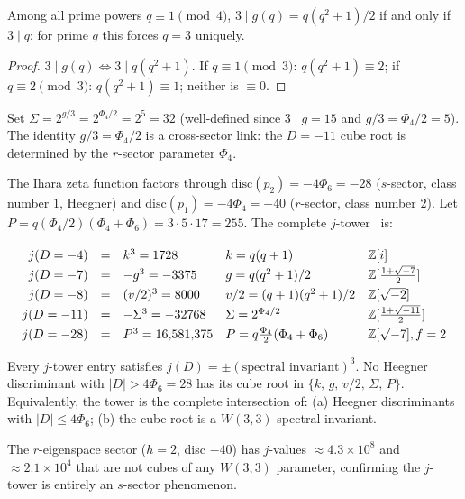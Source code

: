 \begin{remark}[C6: divisibility of $g$ by $3$]\label{rem:C6}
Among all prime powers $q\equiv 1\pmod 4$, $3\mid g(q)=q(q^2+1)/2$
if and only if $3\mid q$; for prime $q$ this forces $q=3$ uniquely.
\begin{proof}
$3\mid g(q)\Leftrightarrow 3\mid q(q^2+1)$.
If $q\equiv 1\pmod 3$: $q(q^2+1)\equiv 2$;
if $q\equiv 2\pmod 3$: $q(q^2+1)\equiv 1$; neither is $\equiv 0$.
\end{proof}
Set $\Sigma=2^{g/3}=2^{\Phi_4/2}=2^5=32$ (well-defined since $3\mid g=15$
and $g/3=\Phi_4/2=5$). The identity $g/3=\Phi_4/2$ is a cross-sector link:
the $D=-11$ cube root is determined by the $r$-sector parameter $\Phi_4$.
\end{remark}

The Ihara zeta function factors through
$\mathrm{disc}(p_2)=-4\Phi_6=-28$ ($s$-sector, class number $1$, Heegner) and
$\mathrm{disc}(p_1)=-4\Phi_4=-40$ ($r$-sector, class number $2$).
Let $P=q(\Phi_4/2)(\Phi_4+\Phi_6)=3\cdot 5\cdot 17=255$.
The complete $j$-tower~\cite{LMFDB} is:

\begin{equation}\label{eq:jtower}
\renewcommand{\arraystretch}{1.3}
\begin{array}{rcllll}
  j(D=-4)  &=& k^3 = 1728         &k=q(q+1)         &\mathbb{Z}[i]\\
  j(D=-7)  &=& -g^3 = -3375       &g=q(q^2+1)/2     &\mathbb{Z}[\tfrac{1+\sqrt{-7}}{2}]\\
  j(D=-8)  &=& (v/2)^3 = 8000     &v/2=(q+1)(q^2+1)/2&\mathbb{Z}[\sqrt{-2}]\\
  j(D=-11) &=& -\Sigma^3 = -32768 &\Sigma=2^{\Phi_4/2}&\mathbb{Z}[\tfrac{1+\sqrt{-11}}{2}]\\
  j(D=-28) &=& P^3=16{,}581{,}375 &P=q\tfrac{\Phi_4}{2}(\Phi_4+\Phi_6)&\mathbb{Z}[\sqrt{-7}],f=2
\end{array}
\end{equation}

\begin{proposition}\label{prop:cube}
Every $j$-tower entry satisfies $j(D)=\pm(\text{spectral invariant})^3$.
No Heegner discriminant with $|D|>4\Phi_6=28$ has its cube root
in $\{k,\,g,\,v/2,\,\Sigma,\,P\}$.
Equivalently, the tower is the complete intersection of:
\textnormal{(a)} Heegner discriminants with $|D|\leq 4\Phi_6$;\;
\textnormal{(b)} the cube root is a $W(3,3)$ spectral invariant.
\end{proposition}

\noindent
The $r$-eigenspace sector ($h=2$, disc $-40$) has $j$-values
$\approx 4.3\times 10^8$ and $\approx 2.1\times 10^4$ that are not
cubes of any $W(3,3)$ parameter, confirming the $j$-tower is entirely
an $s$-sector phenomenon.
